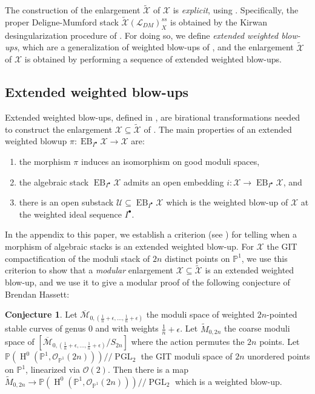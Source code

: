 \documentclass{amsart}
\newcommand{\bP}{\mathbb{P}}
\newcommand{\oH}{\operatorname{H}}
\newcommand{\cL}{\mathcal{L}}
\newcommand{\cM}{\mathcal{M}}
\newcommand{\cO}{\mathcal{O}}
\newcommand{\cU}{\mathcal{U}}
\newcommand{\cX}{\mathcal{X}}
\newcommand{\PGL}{\operatorname{PGL}}
\DeclareMathOperator{\EB}{EB}
\theoremstyle{definition}
\newtheorem{Conjecture}[theorem]{Conjecture}
\theoremstyle{definition}
\begin{document}
{The construction of the enlargement $\widetilde{\cX}$ of $\cX$ is \textit{explicit}, using \cite{ER21}. Specifically, the proper Deligne-Mumford stack $\widetilde{\cX}(\cL_{DM})^{ss}_X$ is obtained by the Kirwan desingularization procedure of \cites{ER21,kirwan}. For doing so, we define \textit{extended weighted blow-ups}, which are a generalization of weighted blow-ups of \cite{QR}, and
the enlargement $\widetilde{\cX}$ of $\cX$ is obtained by performing a sequence of extended weighted blow-ups.

\subsection{Extended weighted blow-ups}
Extended weighted blow-ups, defined in , are birational transformations needed to construct the enlargement $\cX\subseteq \widetilde{\cX}$ of . The main properties of an extended weighted blowup $\pi:\EB_{I^\bullet}\cX\to \cX$ are:
\begin{enumerate}
    \item the morphism $\pi$ induces an isomorphism on good moduli spaces,
    \item the algebraic stack $\EB_{I^\bullet}\cX$ admits an open embedding $i:\cX\to \EB_{I^\bullet}\cX$, and
    \item there is an open substack $\cU\subseteq \EB_{I^\bullet}\cX$ which is the weighted blow-up of $\cX$ at the weighted ideal sequence $I^\bullet$. 
\end{enumerate}
In the appendix to this paper, we establish a criterion (see ) for telling when a morphism of algebraic stacks is an extended weighted blow-up. For $\cX$ the GIT compactification of the moduli stack of $2n$ distinct points on $\bP^1$, we use this criterion to show that a \textit{modular} enlargement $\cX\subseteq \widetilde{\cX}$ is an extended weighted blow-up,
and we use it to give a modular proof of the following conjecture of Brendan Hassett:
\begin{Conjecture}\label{conjecture_hassett}
    Let $\overline{\cM}_{0,(\frac{1}{n}  + \epsilon,\ldots,\frac{1}{n}  + \epsilon)}$ the moduli space of weighted $2n$-pointed stable curves of genus 0 and with weights $\frac{1}{n}+\epsilon$. Let $\widetilde{M}_{0,2n}$ the coarse moduli space of $[\overline{\cM}_{0,(\frac{1}{n}  + \epsilon,\ldots,\frac{1}{n}  + \epsilon)}/S_{2n}]$ where the action permutes the $2n$ points. Let $\bP(\oH^0(\bP^1,\cO_{\bP^1}(2n)))/\!\!/\PGL_2$ the GIT moduli space of $2n$ unordered points on $\bP^1$, linearized via $\cO(2)$. Then there is a map $\widetilde{M}_{0,2n}\to \bP(\oH^0(\bP^1,\cO_{\bP^1}(2n)))/\!\!/\PGL_2$ which is a weighted blow-up.

\end{Conjecture}}
\end{document}
